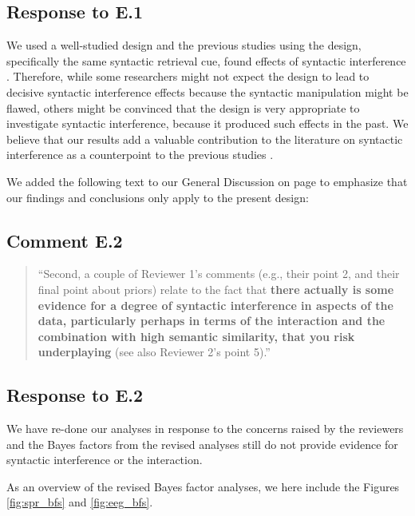 \documentclass[12pt]{article}
\begin{document}
\subsection*{Response to E.1}
We used a well-studied design and the previous studies using the design, specifically the same syntactic retrieval cue, found effects of syntactic interference \citep{vandyke07, mertzen}. Therefore, while some researchers might not expect the design to lead to decisive syntactic interference effects because the syntactic manipulation might be flawed, others might be convinced that the design is very appropriate to investigate syntactic interference, because it produced such effects in the past. We believe that our results add a valuable contribution to the literature on syntactic interference as a counterpoint to the previous studies \citep{vandyke07, mertzen}.

We added the following text to our General Discussion on page \pageref{only_this_design} to emphasize that our findings and conclusions only apply to the present design:


\subsection*{Comment E.2}

\begin{quote}
``Second, a couple of Reviewer 1's comments (e.g., their point 2, and their final point about priors) relate to the fact that \textbf{there actually is some evidence for a degree of syntactic interference in aspects of the data, particularly perhaps in terms of the interaction and the combination with high semantic similarity, that you risk underplaying} (see also Reviewer 2's point 5).''
\end{quote}


\subsection*{Response to E.2}
We have re-done our analyses in response to the concerns raised by the reviewers and the Bayes factors from the revised analyses still do not provide evidence for syntactic interference or the interaction.

As an overview of the revised Bayes factor analyses, we here include the Figures \ref{fig:spr_bfs} and \ref{fig:eeg_bfs}.

\setcounter{figure}{4}
\end{document}
